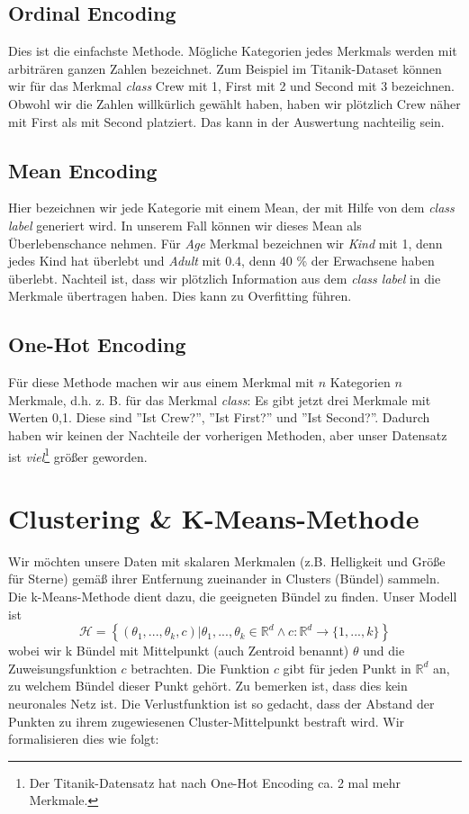 \subsection{Ordinal Encoding}
Dies ist die einfachste Methode. Mögliche Kategorien jedes Merkmals werden mit arbiträren ganzen Zahlen bezeichnet. Zum Beispiel im Titanik-Dataset können wir für das Merkmal \textit{class} Crew mit 1, First mit 2 und Second mit 3 bezeichnen. Obwohl wir die Zahlen willkürlich gewählt haben, haben wir plötzlich Crew näher mit First als mit Second platziert. Das kann  in der Auswertung nachteilig sein.

\subsection{Mean Encoding}
Hier bezeichnen wir jede Kategorie mit einem Mean, der mit Hilfe von dem \textit{class label} generiert wird. In unserem Fall können wir dieses Mean als Überlebenschance nehmen. Für \textit{Age} Merkmal bezeichnen wir \textit{Kind} mit 1, denn jedes Kind hat überlebt und \textit{Adult} mit 0.4, denn 40 \% der Erwachsene haben überlebt. Nachteil ist, dass wir plötzlich Information aus dem \textit{class label} in die Merkmale übertragen haben. Dies kann zu Overfitting führen.

\subsection{One-Hot Encoding}
Für diese Methode machen wir aus einem Merkmal mit $n$ Kategorien $n$ Merkmale, d.h. z. B. für das Merkmal \textit{class}: Es gibt jetzt drei Merkmale mit Werten {0,1}. Diese sind ''Ist Crew?'', ''Ist First?'' und ''Ist Second?''. Dadurch haben wir keinen der Nachteile der vorherigen Methoden, aber unser Datensatz ist \textit{viel}\footnote{Der Titanik-Datensatz hat nach One-Hot Encoding ca. 2 mal mehr Merkmale.} größer geworden. 


\section{Clustering \& K-Means-Methode}
Wir möchten unsere Daten mit skalaren Merkmalen (z.B. Helligkeit und Größe für Sterne) gemäß ihrer Entfernung zueinander in Clusters (Bündel) sammeln. Die k-Means-Methode dient dazu, die geeigneten Bündel zu finden. Unser Modell ist
\begin{equation}
     \mathcal{H} = \left\{ (\theta_1,...,\theta_k,c) | \theta_1,...,\theta_k \in \mathbb{R}^d \land c : \mathbb{R}^d \to \{1,...,k\} \right\}
\end{equation}
wobei wir k Bündel mit Mittelpunkt (auch Zentroid benannt) $\theta$ und die Zuweisungsfunktion $c$ betrachten. Die Funktion $c$ gibt für jeden Punkt in $\mathbb{R}^d$ an, zu welchem Bündel dieser Punkt gehört. Zu bemerken ist, dass dies kein neuronales Netz ist. Die Verlustfunktion ist so gedacht, dass der Abstand der Punkten zu ihrem zugewiesenen Cluster-Mittelpunkt bestraft wird. Wir formalisieren dies wie folgt:\\

